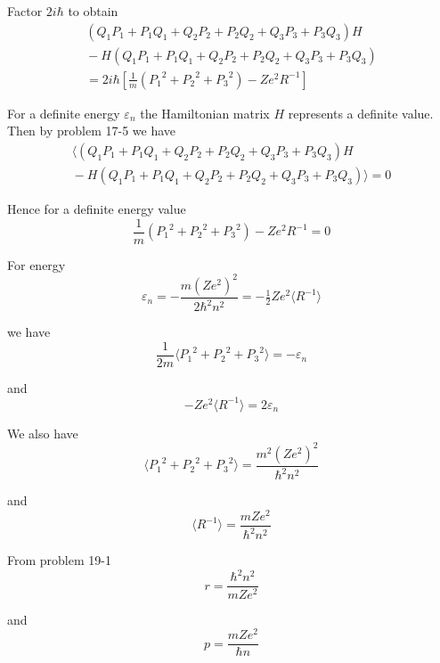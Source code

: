 Factor $2i\hbar$ to obtain
\begin{multline*}
(Q_1P_1+P_1Q_1+Q_2P_2+P_2Q_2+Q_3P_3+P_3Q_3)H
\\
{}-H(Q_1P_1+P_1Q_1+Q_2P_2+P_2Q_2+Q_3P_3+P_3Q_3)
\\
{}=2i\hbar\left[\frac{1}{m}\left({P_1}^2+{P_2}^2+{P_3}^2\right)-Ze^2R^{-1}\right]
\end{multline*}

For a definite energy $\varepsilon_n$ the Hamiltonian matrix $H$ represents a definite value.
Then by problem 17-5 we have
\begin{multline*}
\langle(Q_1P_1+P_1Q_1+Q_2P_2+P_2Q_2+Q_3P_3+P_3Q_3)H
\\
{}-H(Q_1P_1+P_1Q_1+Q_2P_2+P_2Q_2+Q_3P_3+P_3Q_3)\rangle=0
\end{multline*}

Hence for a definite energy value
\begin{equation*}
\frac{1}{m}\left({P_1}^2+{P_2}^2+{P_3}^2\right)-Ze^2R^{-1}=0
\end{equation*}

For energy
\begin{equation*}
\varepsilon_n
=-\frac{m(Ze^2)^2}{2\hbar^2n^2}
=-\tfrac{1}{2}Ze^2\langle R^{-1}\rangle
\end{equation*}

we have
\begin{equation*}
\frac{1}{2m}\langle{P_1}^2+{P_2}^2+{P_3}^2\rangle=-\varepsilon_n
\end{equation*}

and
\begin{equation*}
-Ze^2\langle R^{-1}\rangle=2\varepsilon_n
\end{equation*}

We also have
\begin{equation*}
\langle{P_1}^2+{P_2}^2+{P_3}^2\rangle=\frac{m^2(Ze^2)^2}{\hbar^2n^2}
\end{equation*}

and
\begin{equation*}
\langle R^{-1}\rangle=\frac{mZe^2}{\hbar^2n^2}
\end{equation*}

From problem 19-1
\begin{equation*}
r=\frac{\hbar^2n^2}{mZe^2}
\end{equation*}

and
\begin{equation*}
p=\frac{mZe^2}{\hbar n}
\end{equation*}

